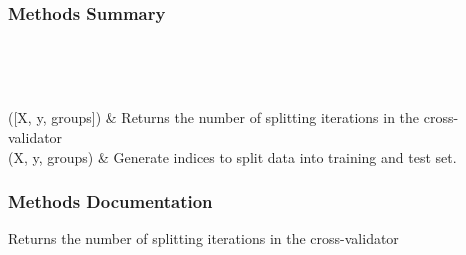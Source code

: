 \documentclass[letterpaper,10pt,english]{sphinxmanual}
\begin{document}
\begin{fulllineitems}
\begin{description}
\end{description}
\subsubsection*{Methods Summary}


\begin{savenotes}\sphinxatlongtablestart\begin{longtable}[c]{}
\hline

\endfirsthead

%
{}\\
\hline

\endhead

\hline
{}\\
\endfoot

\endlastfoot

{\hyperref[\detokenize{api/mastml.data_splitters.JustEachGroup:mastml.data_splitters.JustEachGroup.get_n_splits}]{}}({[}X, y, groups{]})
&
Returns the number of splitting iterations in the cross-validator
\\
\hline
{\hyperref[\detokenize{api/mastml.data_splitters.JustEachGroup:mastml.data_splitters.JustEachGroup.split}]{}}(X, y, groups)
&
Generate indices to split data into training and test set.
\\
\hline
\end{longtable}\sphinxatlongtableend\end{savenotes}
\subsubsection*{Methods Documentation}

\begin{fulllineitems}
\label{\detokenize{api/mastml.data_splitters.JustEachGroup:mastml.data_splitters.JustEachGroup.get_n_splits}}
Returns the number of splitting iterations in the cross-validator

\end{fulllineitems}


\end{fulllineitems}
\end{document}
